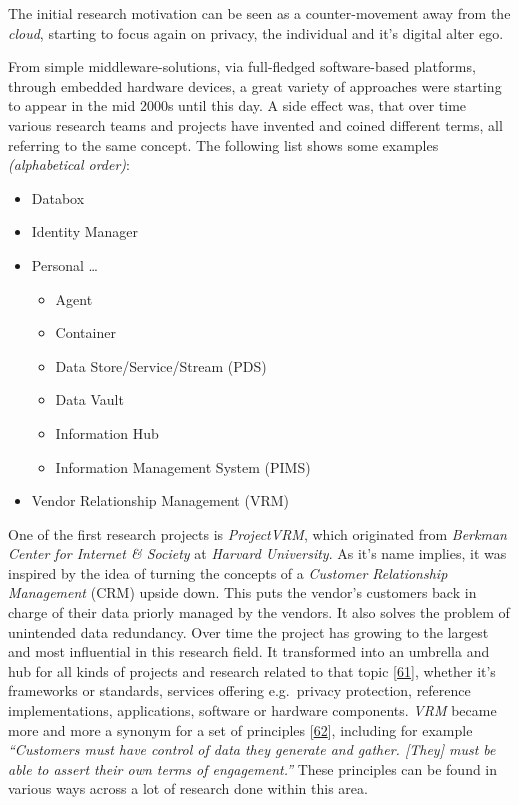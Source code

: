 \documentclass[12pt,english,a4paper,titlepage,cleardoublepage=empty,dottedtoc]{report}
\providecommand{\tightlist}{%
  \setlength{\itemsep}{0pt}\setlength{\parskip}{0pt}}
\begin{document}
The initial research motivation can be seen as a counter-movement away
from the \emph{cloud}, starting to focus again on privacy, the
individual and it's digital alter ego.

From simple middleware-solutions, via full-fledged software-based
platforms, through embedded hardware devices, a great variety of
approaches were starting to appear in the mid 2000s until this day. A
side effect was, that over time various research teams and projects have
invented and coined different terms, all referring to the same concept.
The following list shows some examples \emph{(alphabetical order)}:

\begin{itemize}
\tightlist
\item
  Databox
\item
  Identity Manager
\item
  Personal \ldots{}

  \begin{itemize}
  \tightlist
  \item
    Agent
  \item
    Container
  \item
    Data Store/Service/Stream (PDS)
  \item
    Data Vault
  \item
    Information Hub
  \item
    Information Management System (PIMS)
  \end{itemize}
\item
  Vendor Relationship Management (VRM)
\end{itemize}

One of the first research projects is \emph{ProjectVRM}, which
originated from \emph{Berkman Center for Internet \& Society} at
\emph{Harvard University}. As it's name implies, it was inspired by the
idea of turning the concepts of a \emph{Customer Relationship
Management} (CRM) upside down. This puts the vendor's customers back in
charge of their data priorly managed by the vendors. It also solves the
problem of unintended data redundancy. Over time the project has growing
to the largest and most influential in this research field. It
transformed into an umbrella and hub for all kinds of projects and
research related to that topic
{[}\protect\hyperlink{ref-web_2016_projectvrm_development-work}{61}{]},
whether it's frameworks or standards, services offering e.g.~privacy
protection, reference implementations, applications, software or
hardware components. \emph{VRM} became more and more a synonym for a set
of principles
{[}\protect\hyperlink{ref-web_2016_projectvrm_principles}{62}{]},
including for example \emph{``Customers must have control of data they
generate and gather. {[}They{]} must be able to assert their own terms
of engagement.''} These principles can be found in various ways across a
lot of research done within this area.
\end{document}
